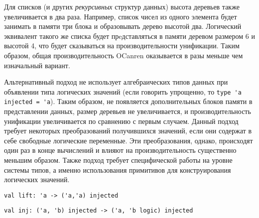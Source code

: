 \documentclass[10pt]{article}
\begin{document}

Для списков (и других \emph{рекурсивных} структур данных) высота деревьев также увеличивается в два раза. Например,
список чисел из одного элемента будет занимать в памяти три блока и образовывать дерево высотой два. Логический
эквивалент такого же списка будет прeдставляться в памяти деревом размером 6 и высотой 4, что будет сказываться 
на производительности унификации. Таким образом, общая производительность OCanren оказывается в разы меньше чем 
изначальный вариант.

Альтернативный подход не использует алгебраических типов данных при объявлении типа логических значений 
(если говорить упрощенно, то \verb|type 'a injected = 'a|).
Таким образом, не появляется дополнительных блоков памяти в представлении данных, размер деревьев не увеличивается,
и производительность унификации увеличивается по сравнению с первым случаем. Данный подход требует некоторых преобразований 
получившихся значений, если они содержат в себе свободные логические переменные. Эти преобразования, однако, происходят один раз в конце 
вычислений и влияют на производительность существенно меньшим образом. Также подход требует специфической
работы на уровне системы типов, а именно использования примитивов для конструирования логических значений.

 \verb|val lift: 'a -> ('a,'a) injected|

 \verb|val inj: ('a, 'b) injected -> ('a, 'b logic) injected|
\end{document}
